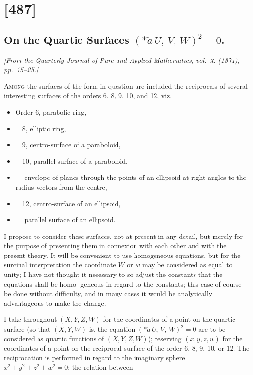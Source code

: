 \documentclass[11pt,a4paper]{book}
\begin{document}
\clearpage

\section{[487]}
\subsection{On the Quartic Surfaces $(*\!\check{a}\,U,\,V,\,W)^2=0$.}

\begin{center}
\textit{[From the Quarterly Journal of Pure and Applied Mathematics, vol.~\textsc{x}. (1871), pp.~15--25.]}
\end{center}

\textsc{Among} the surfaces of the form in question are included the reciprocals
of several interesting surfaces of the orders 6, 8, 9, 10, and 12, viz.\
\begin{itemize}[leftmargin=2em]
\item[] Order 6, parabolic ring,
\item[] \ \ 8, elliptic ring,
\item[] \ \ 9, centro-surface of a paraboloid,
\item[] \ \ 10, parallel surface of a paraboloid,
\item[] \ \ \phantom{10,} envelope of planes through the points of an ellipsoid at right angles
       to the radius vectors from the centre,
\item[] \ \ 12, centro-surface of an ellipsoid,
\item[] \ \ \phantom{12,} parallel surface of an ellipsoid.
\end{itemize}

I propose to consider these surfaces, not at present in any detail, but merely for
the purpose of presenting them in connexion with each other and with the present
theory.  It will be convenient to use homogeneous equations, but for the surcinal
interpretation the coordinate $W$ or $w$ may be considered as equal to unity; I have
not thought it necessary to so adjust the constants that the equations shall be homo-
geneous in regard to the constants; this case of course be done without difficulty, and
in many cases it would be analytically advantageous to make the change.

I take throughout $(X, Y, Z, W)$ for the coordinates of a point on the quartic
surface (so that $(X, Y, W)$ is, the equation $(*\!\check{a}\,U,\,V,\,W)^2=0$ are to be considered as
quartic functions of $(X, Y, Z, W)$); reserving $(x, y, z, w)$ for the coordinates of a
point on the reciprocal surface of the order 6, 8, 9, 10, or 12.  The reciprocation is
performed in regard to the imaginary sphere $x^2 + y^2 + z^2 + w^2 = 0$; the relation between
\end{document}
